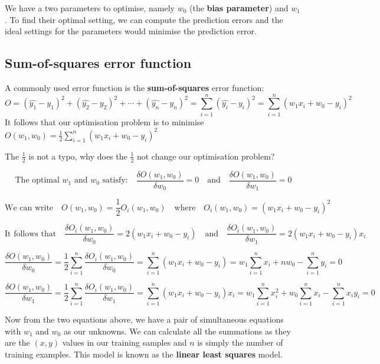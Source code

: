 \documentclass[11pt,fleqn]{book} %
\begin{document}
\noindent
We have a two parameters to optimise, namely $w_0$ (the \textbf{bias parameter}) and $w_1$. To find their optimal setting, we can compute the prediction errors and the ideal settings for the parameters would minimise the prediction error.

\subsection{Sum-of-squares error function}
A commonly used error function is the \textbf{sum-of-squares} error function:
$$O = (\hat{y_1} - y_1)^2 + (\hat{y_2} - y_2)^2 + \cdots + (\hat{y_n} - y_n)^2 = \sum^n_{i=1}(\hat{y_i} - y_i)^2 = \sum^n_{i=1}(w_1x_i + w_0 - y_i)^2$$
It follows that our optimisation problem is to minimise $O(w_1, w_0) = \frac{1}{2}\sum^n_{i = 1}(w_1x_i + w_0 - y_i)^2$

\begin{exercise}
	The $\frac{1}{2}$ is not a typo, why does the $\frac{1}{2}$ not change our optimisation problem?
\end{exercise}

$$\text{The optimal $w_1$ and $w_0$ satisfy:} \quad \frac{\delta O(w_1, w_0)}{\delta w_0} = 0 \quad \text{and} \quad \frac{\delta O(w_1, w_0)}{\delta w_1} = 0 $$

$$\text{We can write} \quad O(w_1, w_0) = \frac{1}{2} O_i(w_1, w_0) \quad \text{where} \quad O_i(w_1, w_0) = (w_1x_i + w_0 - y_i)^2$$

$$\text{It follows that} \quad \frac{\delta O_i(w_1, w_0)}{\delta w_0} = 2(w_1x_i + w_0 - y_i) \quad \text{and} \quad \frac{\delta O_i(w_1, w_0)}{\delta w_1} = 2(w_1x_i + w_0 - y_i)x_i$$

$$\frac{\delta O(w_1, w_0)}{\delta w_0} = \frac{1}{2}\sum_{i=1}^n\frac{\delta O_i(w_1, w_0)}{\delta w_0} = \sum^n_{i=1}(w_1x_i + w_0 - y_i) = w_1 \sum^n_{i=1} x_i + nw_0 - \sum^n_{i=1} y_i = 0$$

$$\frac{\delta O(w_1, w_0)}{\delta w_1} = \frac{1}{2}\sum_{i=1}^n\frac{\delta O_i(w_1, w_0)}{\delta w_1} = \sum^n_{i=1}(w_1x_i + w_0 - y_i)x_i = w_1 \sum^n_{i=1} x_i^2 + w_0 \sum^n_{i=1} x_i - \sum^n_{i=1} x_iy_i = 0$$

\noindent
Now from the two equations above, we have a pair of simultaneous equations with $w_1$ and $w_0$ as our unknowns. We can calculate all the summations as they are the $(x, y)$ values in our training samples and $n$ is simply the number of training examples. This model is known as the \textbf{linear least squares} model.
\end{document}

